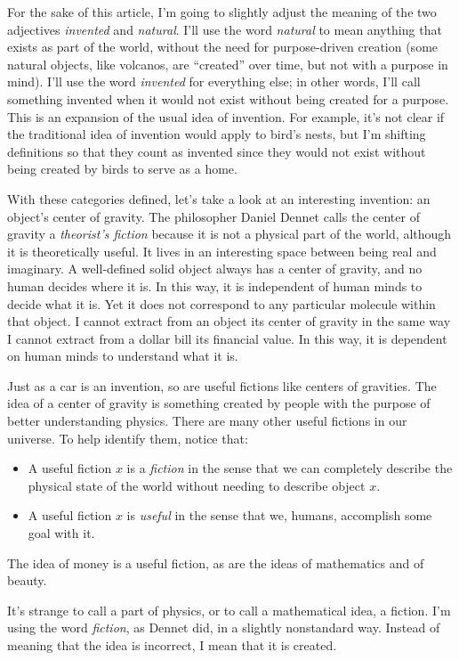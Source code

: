 \documentclass[11pt, oneside]{article}   	%
\begin{document}
For the sake of this article, I'm going to slightly adjust the meaning of the
two adjectives {\em invented} and {\em natural}.
I'll use the word {\em natural} to mean anything that exists as part of the
world, without the need for purpose-driven
creation (some natural objects, like volcanos, are ``created''
over time, but not with a purpose in mind).
I'll use the word {\em invented} for everything else; in other words, I'll call
something invented when it would not exist without being created for a purpose.
This is an expansion of the usual idea of invention.
For example,
it's not clear if the traditional idea of invention would apply to bird's nests,
but I'm shifting definitions so that they count as invented since
they would not exist without being created by birds to serve as a home.

With these categories defined,
let's take a look at an interesting invention: an object's
center of gravity.
The philosopher Daniel Dennet calls the center of gravity
a {\em theorist's fiction}
because it is not a physical part of the world, although it is theoretically
useful.
It lives in an interesting space between being real and imaginary.
A well-defined solid object always has a center of gravity,
and no human decides where it is. In this way, it is independent of human minds
to decide what it is.
Yet it does not correspond to any particular molecule within that object.
I cannot extract from an object its center of gravity in the same way
I cannot extract from a dollar bill its financial value.
In this way, it is dependent on human minds to understand what it is.

Just as a car is an invention, so are useful fictions like centers of gravities.
The idea of a center of gravity is something created by
people with the purpose of better understanding physics.
There are many other useful fictions in our universe. To help identify them,
notice that:
\begin{itemize}
    \item A useful fiction $x$ is a {\em fiction}
        in the sense that we can completely
        describe the physical state of the world without needing to describe
        object $x$.
    \item A useful fiction $x$ is {\em useful} in the sense that we, humans,
        accomplish some goal with it.
\end{itemize}
The idea of money is a useful fiction, as are the ideas of mathematics and
of beauty.

It's strange to call a part of physics, or to call a mathematical idea, a
fiction. 
I'm using the word {\em fiction}, as Dennet did, in a slightly
nonstandard way.
Instead of meaning that the idea is incorrect, I mean that it is created.
\end{document}
